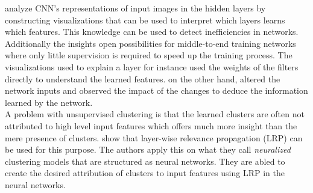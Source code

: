 \textcite{2018-zhang-visual} analyze CNN's representations of input images in the hidden layers by constructing 
visualizations that can be used to interpret which layers learns which features. This knowledge can be used to
detect inefficiencies in networks. Additionally the insights open possibilities for middle-to-end training
networks where only little supervision is required to speed up the training process.
The visualizations used to explain a layer for instance used the weights of the filters directly to understand
the learned features. \textcite{2018-montavon-methods} on the other hand, altered the network inputs and observed 
the impact of the changes to deduce the information learned by the network.\\

A problem with unsupervised clustering is that the learned clusters are often not attributed to high level input
features which offers much more insight than the mere presence of clusters. \textcite{2019-Kauffmann-from} show 
that layer-wise relevance propagation (LRP) can be used for this purpose. The authors apply this on
what they call \textit{neuralized} clustering models that are structured as neural networks. They are abled to 
create the desired attribution of clusters to input features using LRP in the neural networks. 



